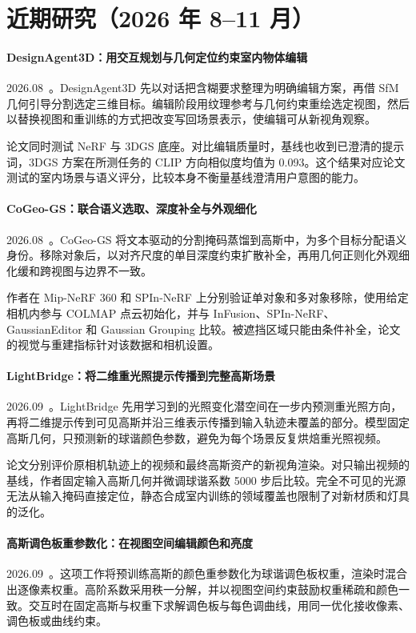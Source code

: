 \section{近期研究（2026 年 8--11 月）}
\paragraph{DesignAgent3D：用交互规划与几何定位约束室内物体编辑}
2026.08~\cite{2608_21438}。DesignAgent3D 先以对话把含糊要求整理为明确编辑方案，再借 SfM 几何引导分割选定三维目标。编辑阶段用纹理参考与几何约束重绘选定视图，然后以替换视图和重训练的方式把改变写回场景表示，使编辑可从新视角观察。

论文同时测试 NeRF 与 3DGS 底座。对比编辑质量时，基线也收到已澄清的提示词，3DGS 方案在所测任务的 CLIP 方向相似度均值为 0.093。这个结果对应论文测试的室内场景与语义评分，比较本身不衡量基线澄清用户意图的能力。

\paragraph{CoGeo-GS：联合语义选取、深度补全与外观细化}
2026.08~\cite{2608_26656}。CoGeo-GS 将文本驱动的分割掩码蒸馏到高斯中，为多个目标分配语义身份。移除对象后，以对齐尺度的单目深度约束扩散补全，再用几何正则化外观细化缓和跨视图与边界不一致。

作者在 Mip-NeRF 360 和 SPIn-NeRF 上分别验证单对象和多对象移除，使用给定相机内参与 COLMAP 点云初始化，并与 InFusion、SPIn-NeRF、GaussianEditor 和 Gaussian Grouping 比较。被遮挡区域只能由条件补全，论文的视觉与重建指标针对该数据和相机设置。

\paragraph{LightBridge：将二维重光照提示传播到完整高斯场景}
2026.09~\cite{2609_02543}。LightBridge 先用学习到的光照变化潜空间在一步内预测重光照方向，再将二维提示传到可见高斯并沿三维表示传播到输入轨迹未覆盖的部分。模型固定高斯几何，只预测新的球谐颜色参数，避免为每个场景反复烘焙重光照视频。

论文分别评价原相机轨迹上的视频和最终高斯资产的新视角渲染。对只输出视频的基线，作者固定输入高斯几何并微调球谐系数 5000 步后比较。完全不可见的光源无法从输入掩码直接定位，静态合成室内训练的领域覆盖也限制了对新材质和灯具的泛化。

\paragraph{高斯调色板重参数化：在视图空间编辑颜色和亮度}
2026.09~\cite{2609_03897}。这项工作将预训练高斯的颜色重参数化为球谐调色板权重，渲染时混合出逐像素权重。高阶系数采用秩一分解，并以视图空间约束鼓励权重稀疏和颜色一致。交互时在固定高斯与权重下求解调色板与每色调曲线，用同一优化接收像素、调色板或曲线约束。

